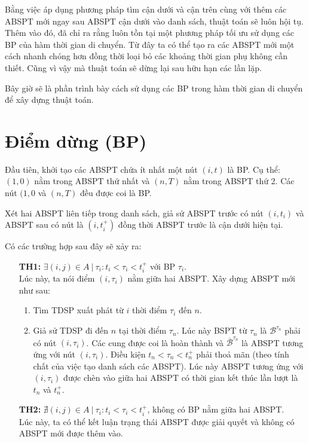 \documentclass[../main.tex]{subfiles}
\begin{document}
Bằng việc áp dụng phương pháp tìm cận dưới và cận trên cùng với thêm các ABSPT mới ngay sau ABSPT cận dưới vào danh sách, thuật toán sẽ luôn hội tụ. 
Thêm vào đó, \cite{foschini2011complexity} đã chỉ ra rằng luôn tồn tại một phương pháp tối ưu sử dụng
các BP của hàm thời gian di chuyển. Từ đây ta có thể
tạo ra các ABSPT mới một cách nhanh chóng hơn
đồng thời loại bỏ các khoảng thời gian phụ không cần thiết. Cũng vì vậy
mà thuật toán sẽ dừng lại sau hữu hạn các lần lặp.

Bây giờ sẽ là phần trình bày cách sử dụng các BP trong hàm thời
gian di chuyển để xây dựng thuật toán.

\section{Điểm dừng (BP)}\label{ux111iux1ec3m-dux1eebng}

Đầu tiên, khởi tạo các ABSPT chứa ít nhất một nút \((i, t)\) là BP. 
Cụ thể: \((1, 0)\) nằm trong ABSPT thứ nhất và \((n, T)\) nằm
trong ABSPT thứ 2. Các nút \((1, 0\) và \((n, T)\) đều được coi là BP.

Xét hai ABSPT liên tiếp trong danh sách, giả sử ABSPT trước có nút
\((i, t_i)\) và ABSPT sau có nút là \((i, t_i^+)\) đồng thời ABSPT trước
là cận dưới hiện tại.

Có các trường hợp sau đây sẽ xảy ra:

\begin{itemize}
\tightlist
\item[\textbf{TH1:}]
  \(\exists (i, j) \in A\ |\ \tau_i:t_i < \tau_i < t_i^+\) với BP
  \(\tau_i\). \\ 
  Lúc này, ta nói điểm \((i, \tau_i)\) nằm giữa hai ABSPT.
  Xây dựng ABSPT mới như sau:

  \begin{enumerate}
  \def\labelenumi{\arabic{enumi}.}
  \tightlist
  \item
    Tìm TDSP xuất phát từ \(i\) thời điểm \(\tau_i\) đến \(n\).
  \item
    Giả sử TDSP đi đến \(n\) tại thời điểm \(\tau_n\). Lúc này BSPT từ
    \(\tau_n\) là \(\mathcal B ^{\tau_n}\) phải có nút \((i, \tau_i)\). Các cung được coi là hoàn thành và \(\overline {\mathcal B} ^{\tau_n}\)
    là ABSPT tương ứng với nút \((i, \tau_i)\). Điều kiện \(t_n < \tau_n < t_n^+\) phải
    thoả mãn (theo tính chất của việc
    tạo danh sách các ABSPT). Lúc này ABSPT tương ứng với \((i, \tau_i)\) được chèn vào
    giữa hai ABSPT có thời gian kết thúc lần lượt là \(t_n\) và
    \(t_n^+\).
  \end{enumerate}
\item[\textbf{TH2:}]
  \(\nexists (i, j)\in A\ |\ \tau_i: t_i < \tau_i < t_i^+\), không có
  BP nằm giữa hai ABSPT. \\
  Lúc này, ta có thể kết luận trạng thái
  ABSPT được giải quyết và không có ABSPT mới được thêm vào. 
\end{itemize}
\end{document}
